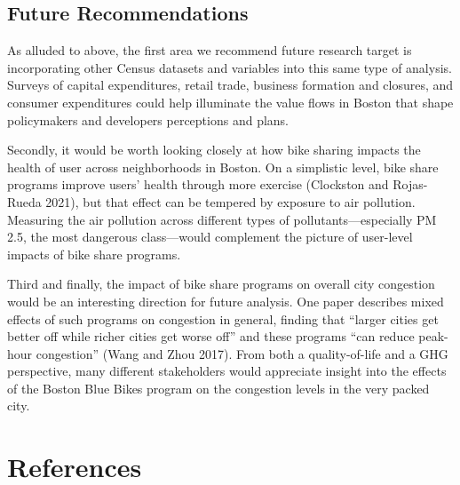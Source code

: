 \documentclass[
  12pt,
]{article}
\begin{document}
\hypertarget{future-recommendations}{%
\subsection{Future Recommendations}\label{future-recommendations}}

As alluded to above, the first area we recommend future research target
is incorporating other Census datasets and variables into this same type
of analysis. Surveys of capital expenditures, retail trade, business
formation and closures, and consumer expenditures could help illuminate
the value flows in Boston that shape policymakers and developers
perceptions and plans.

Secondly, it would be worth looking closely at how bike sharing impacts
the health of user across neighborhoods in Boston. On a simplistic
level, bike share programs improve users' health through more exercise
(Clockston and Rojas-Rueda 2021), but that effect can be tempered by
exposure to air pollution. Measuring the air pollution across different
types of pollutants---especially PM 2.5, the most dangerous
class---would complement the picture of user-level impacts of bike share
programs.

Third and finally, the impact of bike share programs on overall city
congestion would be an interesting direction for future analysis. One
paper describes mixed effects of such programs on congestion in general,
finding that ``larger cities get better off while richer cities get
worse off'' and these programs ``can reduce peak-hour congestion'' (Wang
and Zhou 2017). From both a quality-of-life and a GHG perspective, many
different stakeholders would appreciate insight into the effects of the
Boston Blue Bikes program on the congestion levels in the very packed
city.

\newpage

\hypertarget{references}{%
\section{References}\label{references}}
\end{document}
